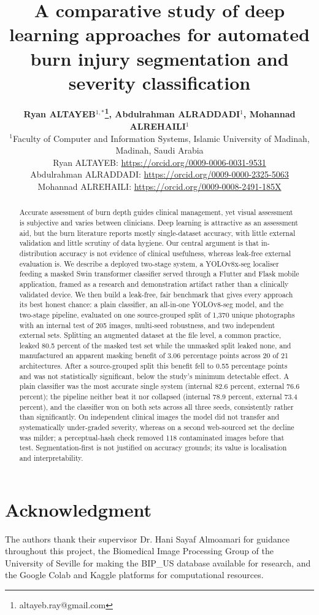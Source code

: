 \documentclass{elektr}
\title{A comparative study of deep learning approaches for automated burn injury segmentation and severity classification}
\author[Altayeb, Alraddadi, and Alrehaili]{
	\textbf{Ryan ALTAYEB$^{1,*}$\thanks{altayeb.ray@gmail.com}, Abdulrahman ALRADDADI$^{1}$, Mohannad ALREHAILI$^{1}$}\\
	$^{1}$Faculty of Computer and Information Systems, Islamic University of Madinah, Madinah, Saudi Arabia\\
	Ryan ALTAYEB: \url{https://orcid.org/0009-0006-0031-9531}\\
	Abdulrahman ALRADDADI: \url{https://orcid.org/0009-0000-2325-5063}\\
	Mohannad ALREHAILI: \url{https://orcid.org/0009-0008-2491-185X}\\[1.8em]
	\rec{...}
	\acc{...}
	\finv{...}
}
\begin{document}
\maketitle

\begin{abstract}
Accurate assessment of burn depth guides clinical management, yet visual assessment is subjective and varies between clinicians. Deep learning is attractive as an assessment aid, but the burn literature reports mostly single-dataset accuracy, with little external validation and little scrutiny of data hygiene. Our central argument is that in-distribution accuracy is not evidence of clinical usefulness, whereas leak-free external evaluation is. We describe a deployed two-stage system, a YOLOv8x-seg localiser feeding a masked Swin transformer classifier served through a Flutter and Flask mobile application, framed as a research and demonstration artifact rather than a clinically validated device. We then build a leak-free, fair benchmark that gives every approach its best honest chance: a plain classifier, an all-in-one YOLOv8-seg model, and the two-stage pipeline, evaluated on one source-grouped split of 1,370 unique photographs with an internal test of 205 images, multi-seed robustness, and two independent external sets. Splitting an augmented dataset at the file level, a common practice, leaked 80.5 percent of the masked test set while the unmasked split leaked none, and manufactured an apparent masking benefit of 3.06 percentage points across 20 of 21 architectures. After a source-grouped split this benefit fell to 0.55 percentage points and was not statistically significant, below the study's minimum detectable effect. A plain classifier was the most accurate single system (internal 82.6 percent, external 76.6 percent); the pipeline neither beat it nor collapsed (internal 78.9 percent, external 73.4 percent), and the classifier won on both sets across all three seeds, consistently rather than significantly. On independent clinical images the model did not transfer and systematically under-graded severity, whereas on a second web-sourced set the decline was milder; a perceptual-hash check removed 118 contaminated images before that test. Segmentation-first is not justified on accuracy grounds; its value is localisation and interpretability.
\end{abstract}

\section*{Acknowledgment}
The authors thank their supervisor Dr. Hani Sayaf Almoamari for guidance throughout this project, the Biomedical Image Processing Group of the University of Seville for making the BIP\_US database available for research, and the Google Colab and Kaggle platforms for computational resources.
\end{document}

